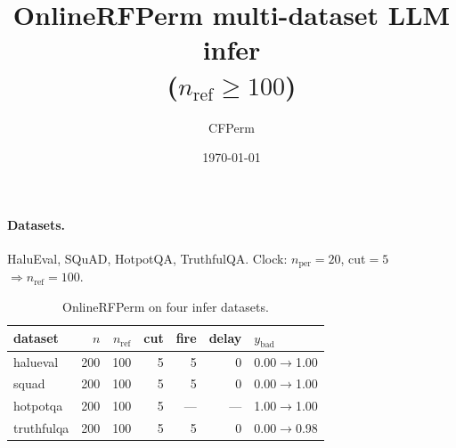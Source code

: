\documentclass[11pt]{article}
\title{OnlineRFPerm multi-dataset LLM infer\\($n_{\mathrm{ref}}\ge 100$)}
\author{CFPerm}
\date{\today}
\begin{document}
\maketitle
\paragraph{Datasets.}
HaluEval, SQuAD, HotpotQA, TruthfulQA. Clock: $n_{\mathrm{per}}=20$, cut$=5$ $\Rightarrow n_{\mathrm{ref}}=100$.
\begin{table}[h]\centering
\caption{OnlineRFPerm on four infer datasets.}
\begin{tabular}{lrrrrrl}
\toprule dataset & $n$ & $n_{\mathrm{ref}}$ & cut & fire & delay & $y_{\mathrm{bad}}$ \\
\midrule
halueval & 200 & 100 & 5 & 5 & 0 & 0.00$\to$1.00 \\
squad & 200 & 100 & 5 & 5 & 0 & 0.00$\to$1.00 \\
hotpotqa & 200 & 100 & 5 & --- & --- & 1.00$\to$1.00 \\
truthfulqa & 200 & 100 & 5 & 5 & 0 & 0.00$\to$0.98 \\
\bottomrule\end{tabular}\end{table}
\end{document}

